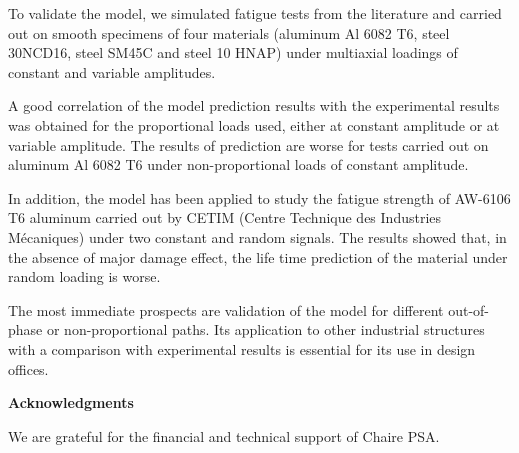 To validate the model, we simulated fatigue tests from the literature and carried out on smooth specimens of four materials (aluminum Al 6082 T6,  steel 30NCD16, steel SM45C and steel 10 HNAP) under multiaxial loadings of constant and variable amplitudes.

A good correlation of the model prediction results with the experimental results was obtained for the proportional loads used, either at constant amplitude or at variable amplitude. The results of prediction are worse for tests carried out on aluminum Al 6082 T6 under non-proportional loads of constant amplitude.

In addition, the model has been applied to study the fatigue strength of AW-6106 T6 aluminum carried out by CETIM (Centre Technique des Industries Mécaniques) under two constant and random signals. The results showed that, in the absence of major damage effect, the life time prediction of the material under random loading is worse. 

The most immediate prospects are validation of the model for different out-of-phase or non-proportional paths. Its application to other industrial structures with a comparison with experimental results is essential for its use in design offices.


\vspace{6pt}
\noindent
\textbf{Acknowledgments}

\vspace{6pt}
We are grateful for the financial and technical support of Chaire PSA.


